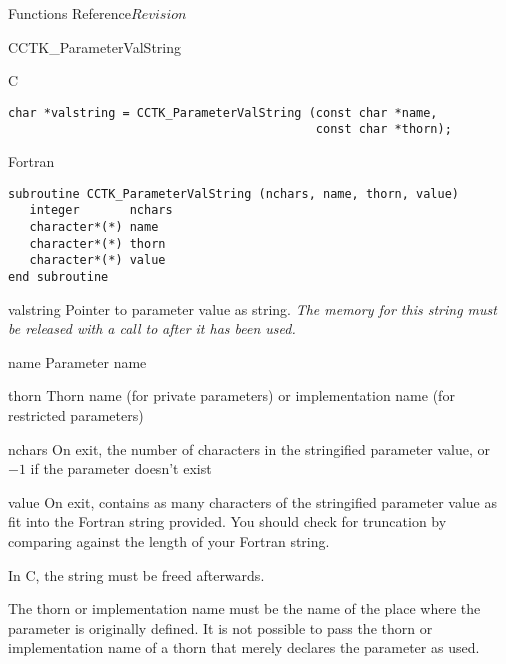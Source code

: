 \begin{cactuspart}{ Functions Reference}{}{$Revision$}
\begin{FunctionDescription}{CCTK\_ParameterValString}
\begin{SynopsisSection}
\begin{Synopsis}{C}
\begin{verbatim}
char *valstring = CCTK_ParameterValString (const char *name,
                                           const char *thorn);
\end{verbatim}
\end{Synopsis}
\begin{Synopsis}{Fortran}
\begin{verbatim}
subroutine CCTK_ParameterValString (nchars, name, thorn, value)
   integer       nchars
   character*(*) name
   character*(*) thorn
   character*(*) value
end subroutine
\end{verbatim}
\end{Synopsis}
\end{SynopsisSection}

\begin{ResultSection}
\begin{Result}{valstring}
Pointer to parameter value as string.  \emph{The memory for this string
must be released with a call to}  \emph{after it has been used.}
\end{Result}
\end{ResultSection}

\begin{ParameterSection}
\begin{Parameter}{name}
Parameter name
\end{Parameter}
\begin{Parameter}{thorn}
Thorn name (for private parameters) or implementation name (for
restricted parameters)
\end{Parameter}
\begin{Parameter}{nchars}
On exit, the number of characters in the stringified parameter value,
or $-1$ if the parameter doesn't exist
\end{Parameter}
\begin{Parameter}{value}
On exit, contains as many characters of the stringified parameter value as
fit into the Fortran string provided.
You should check for truncation by comparing  against the length
of your Fortran string.
\end{Parameter}
\end{ParameterSection}

\begin{Discussion}
In C, the string  must be freed afterwards.

The thorn or implementation name must be the name of the place where
the parameter is originally defined.  It is not possible to pass the
thorn or implementation name of a thorn that merely declares the
parameter as used.


\end{Discussion}
\end{FunctionDescription}
\end{cactuspart}
